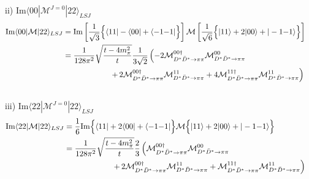\documentclass[aps,prd,preprintnumbers,showpacs,showkeys,nofootinbib,
superscriptaddress,fleqn,floatfix,tightenlines, 10pt]{revtex4-1}
\begin{document}
ii) Im$\langle00|\mathcal{M}^{J=0}|22\rangle_{LSJ}$
\begin{align} \label{Im0022}
	\mathrm{Im} \langle 00|\mathcal{M}|22\rangle_{LSJ}
	&= \mathrm{Im} \left[ \frac{1}{\sqrt{3}}
	\Big\{ \langle 11| - \langle 00| + \langle -1{-1}|\Big\} \right]
	\mathcal{M} \left[ \frac{1}{\sqrt{6}}
	\Big\{ |11\rangle + 2|00\rangle +|-1{-1}\rangle \Big\} \right] \cr
	&= \frac{1}{128\pi^2} \sqrt{\frac{t-4m_\pi^2}{t}} \frac{1}{3\sqrt{2}}\left(
	-2 \mathcal{M}^{00 \dagger}_{D^* \bar{D}^* \rightarrow \pi\pi}
	\mathcal{M}^{00}_{D^* \bar{D}^* \rightarrow \pi\pi} \right. \cr
	&\qquad\qquad\qquad\left.
	+\, 2 \mathcal{M}^{00 \dagger}_{D^* \bar{D}^* \rightarrow \pi\pi}
	\mathcal{M}^{11}_{D^* \bar{D}^* \rightarrow \pi\pi}
	+4 \mathcal{M}^{11 \dagger}_{D^* \bar{D}^* \rightarrow \pi\pi}
	 \mathcal{M}^{11}_{D^* \bar{D}^* \rightarrow \pi\pi}
	\right)
\end{align}\\
iii) Im$\langle22|\mathcal{M}^{J=0}|22\rangle_{LSJ}$
\begin{align} \label{Im2222}
	\mathrm{Im} \langle 22|\mathcal{M}|22\rangle_{LSJ}
	&= \frac{1}{6} \mathrm{Im}
	\Big\{ \langle 11| +2 \langle 00| + \langle -1{-1}|\Big\}
	\mathcal{M} \Big\{ |11\rangle + 2|00\rangle +|-1{-1}\rangle \Big\} \cr
	&= \frac{1}{128\pi^2} \sqrt{\frac{t-4m_\pi^2}{t}} \frac{2}{3}\left(
	\mathcal{M}^{00 \dagger}_{D^* \bar{D}^* \rightarrow \pi\pi}
	\mathcal{M}^{00}_{D^* \bar{D}^* \rightarrow \pi\pi} \right. \cr
	&\qquad\qquad\qquad\left.
	+\, 2 \mathcal{M}^{00 \dagger}_{D^* \bar{D}^* \rightarrow \pi\pi}
	\mathcal{M}^{11}_{D^* \bar{D}^* \rightarrow \pi\pi}
	+ \mathcal{M}^{11 \dagger}_{D^* \bar{D}^* \rightarrow \pi\pi}
	 \mathcal{M}^{11}_{D^* \bar{D}^* \rightarrow \pi\pi}
	\right)
\end{align}\\
\end{document}
